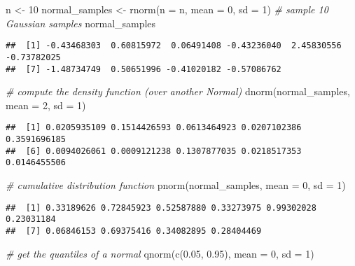 \documentclass[
  oneside]{book}
\newenvironment{Shaded}{\begin{snugshade}}{\end{snugshade}}
\newcommand{\AttributeTok}[1]{\textcolor[rgb]{0.77,0.63,0.00}{#1}}
\newcommand{\CommentTok}[1]{\textcolor[rgb]{0.56,0.35,0.01}{\textit{#1}}}
\newcommand{\DecValTok}[1]{\textcolor[rgb]{0.00,0.00,0.81}{#1}}
\newcommand{\FloatTok}[1]{\textcolor[rgb]{0.00,0.00,0.81}{#1}}
\newcommand{\FunctionTok}[1]{\textcolor[rgb]{0.00,0.00,0.00}{#1}}
\newcommand{\NormalTok}[1]{#1}
\newcommand{\OtherTok}[1]{\textcolor[rgb]{0.56,0.35,0.01}{#1}}
\begin{document}
\begin{Shaded}
\begin{Highlighting}[]
\NormalTok{n }\OtherTok{\textless{}{-}} \DecValTok{10}
\NormalTok{normal\_samples }\OtherTok{\textless{}{-}} \FunctionTok{rnorm}\NormalTok{(}\AttributeTok{n =}\NormalTok{ n, }\AttributeTok{mean =} \DecValTok{0}\NormalTok{, }\AttributeTok{sd =} \DecValTok{1}\NormalTok{) }\CommentTok{\# sample 10 Gaussian samples}
\NormalTok{normal\_samples}
\end{Highlighting}
\end{Shaded}

\begin{verbatim}
##  [1] -0.43468303  0.60815972  0.06491408 -0.43236040  2.45830556 -0.73782025
##  [7] -1.48734749  0.50651996 -0.41020182 -0.57086762
\end{verbatim}

\begin{Shaded}
\begin{Highlighting}[]
\CommentTok{\# compute the density function (over another Normal)}
\FunctionTok{dnorm}\NormalTok{(normal\_samples, }\AttributeTok{mean =} \DecValTok{2}\NormalTok{, }\AttributeTok{sd =} \DecValTok{1}\NormalTok{)}
\end{Highlighting}
\end{Shaded}

\begin{verbatim}
##  [1] 0.0205935109 0.1514426593 0.0613464923 0.0207102386 0.3591696185
##  [6] 0.0094026061 0.0009121238 0.1307877035 0.0218517353 0.0146455506
\end{verbatim}

\begin{Shaded}
\begin{Highlighting}[]
\CommentTok{\# cumulative distribution function}
\FunctionTok{pnorm}\NormalTok{(normal\_samples, }\AttributeTok{mean =} \DecValTok{0}\NormalTok{, }\AttributeTok{sd =} \DecValTok{1}\NormalTok{)}
\end{Highlighting}
\end{Shaded}

\begin{verbatim}
##  [1] 0.33189626 0.72845923 0.52587880 0.33273975 0.99302028 0.23031184
##  [7] 0.06846153 0.69375416 0.34082895 0.28404469
\end{verbatim}

\begin{Shaded}
\begin{Highlighting}[]
\CommentTok{\# get the quantiles of a normal}
\FunctionTok{qnorm}\NormalTok{(}\FunctionTok{c}\NormalTok{(}\FloatTok{0.05}\NormalTok{, }\FloatTok{0.95}\NormalTok{), }\AttributeTok{mean =} \DecValTok{0}\NormalTok{, }\AttributeTok{sd =} \DecValTok{1}\NormalTok{)}
\end{Highlighting}
\end{Shaded}
\end{document}
